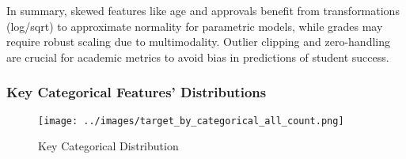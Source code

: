 \documentclass[twoside,final]{hcmut-report}
\begin{document}
In summary, skewed features like age and approvals benefit from transformations (log/sqrt) to approximate normality for parametric models, while grades may require robust scaling due to multimodality. Outlier clipping and zero-handling are crucial for academic metrics to avoid bias in predictions of student success.

\subsubsection{Key Categorical Features' Distributions}

\begin{figure}[H]
  \centering
  \texttt{[image: ../images/target\_by\_categorical\_all\_count.png]}
  \caption{Key Categorical Distribution}
  \label{cat_dist_dist}
\end{figure}
\end{document}
